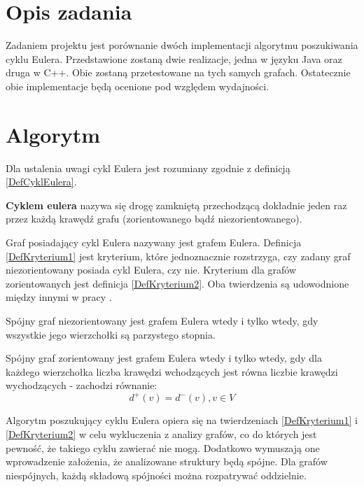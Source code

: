 \section{Opis zadania}

Zadaniem projektu jest porównanie dwóch implementacji algorytmu poszukiwania cyklu Eulera. 
Przedstawione zostaną dwie realizacje, jedna w języku Java oraz druga w C++. 
Obie zostaną przetestowane na tych samych grafach. 
Ostatecznie obie implementacje będą ocenione pod względem wydajności.

\section{Algorytm}

Dla ustalenia uwagi cykl Eulera jest rozumiany zgodnie z  definicją \ref{DefCyklEulera}.

\begin{df}
\label{DefCyklEulera}
\textbf{Cyklem eulera} nazywa się drogę zamkniętą przechodzącą dokładnie jeden raz przez każdą krawędź grafu (zorientowanego bądź niezorientowanego).
\end{df}

Graf posiadający cykl Eulera nazywany jest grafem Eulera. Definicja \ref{DefKryterium1} jest kryterium, które jednoznacznie rozstrzyga, czy zadany graf niezorientowany posiada cykl Eulera, czy nie. Kryterium dla grafów zorientowanych jest definicja \ref{DefKryterium2}. Oba twierdzenia są udowodnione między innymi w pracy  \cite{Wojciechowski}.

\begin{df}
\label{DefKryterium1}
Spójny graf niezorientowany jest grafem Eulera wtedy i tylko wtedy, gdy wszystkie jego wierzchołki są parzystego stopnia.
\end{df}

\begin{df}
\label{DefKryterium2}
Spójny graf zorientowany jest grafem Eulera wtedy i tylko wtedy, gdy dla każdego wierzchołka liczba krawędzi wchodzących jest równa liczbie krawędzi wychodzących - zachodzi równanie:
\[d^{+}(v) = d^{-}(v), v \in V \]
\end{df}

Algorytm poszukujący cyklu Eulera opiera się na twierdzeniach \ref{DefKryterium1} i \ref{DefKryterium2} w celu wykluczenia z analizy grafów, co do których jest pewność, że takiego cyklu zawierać nie mogą.
Dodatkowo wymuszają one wprowadzenie założenia, że analizowane struktury będą spójne.
Dla grafów niespójnych, każdą składową spójności można rozpatrywać oddzielnie.

